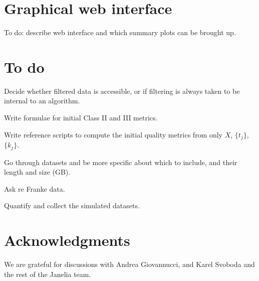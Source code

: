 \documentclass[10pt]{article}
\begin{document}
\section{Graphical web interface}

To do: describe web interface and which summary plots can be brought up.


\section{To do}

Decide whether filtered data is accessible, or if filtering is always
taken to be internal to an algorithm.

Write formulae for initial Class II and III metrics.

Write reference scripts to compute the initial quality metrics from only
$X$, $\{t_j\}$, $\{k_j\}$.

Go through datasets and be more specific about which to include, and their
length and size (GB).

Ask re Franke data.

Quantify and collect the simulated datasets.


\section*{Acknowledgments}
We are grateful for discussions with
Andrea Giovannucci, and Karel Svoboda and the rest of the Janelia team.




\end{document}

